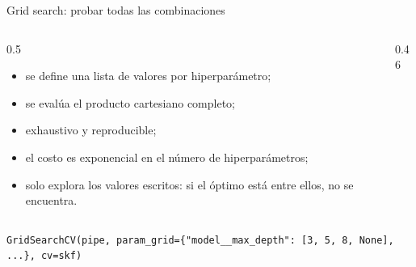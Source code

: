 \documentclass[aspectratio=169,12pt]{beamer}
\begin{document}
\begin{frame}{Grid search: probar todas las combinaciones}
  \begin{columns}[T]
    \begin{column}{0.5\textwidth}
      \small
      \begin{itemize}
        \item se define una lista de valores por hiperparámetro;
        \item se evalúa el producto cartesiano completo;
        \item exhaustivo y reproducible;
        \item el costo es exponencial en el número de hiperparámetros;
        \item solo explora los valores escritos: si el óptimo está entre ellos, no se encuentra.
      \end{itemize}
    \end{column}
    \begin{column}{0.46\textwidth}
      \centering
    \end{column}
  \end{columns}
  \vspace{2pt}
  \footnotesize\texttt{GridSearchCV(pipe, param\_grid=\{"model\_\_max\_depth": [3, 5, 8, None], ...\}, cv=skf)}
\end{frame}
\end{document}
